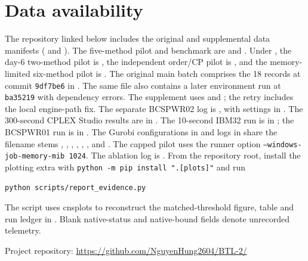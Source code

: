 \documentclass[a4paper,fleqn]{cas-sc}
\begin{document}
\section*{Data availability}
The repository linked below includes the original and supplemental data
manifests ( and ).
The five-method pilot and benchmark are  and
. Under , the day-6
two-method pilot is , the independent order/CP
pilot is , and the memory-limited six-method pilot
is . The original main batch comprises the
18 records at commit \texttt{9df7be6} in .
The same file also contains a later environment run at \texttt{ba35219}
with dependency errors. The supplement uses 
and ; the retry includes the local engine-path
fix. The separate BCSPWR02 log is , with settings in . The 300-second CPLEX Studio results are in . The 10-second IBM32 run is in ; the BCSPWR01 run is in . The Gurobi configurations in  and logs in
 share the filename stems
, , ,
, ,
, and .
The capped pilot uses the runner option \texttt{--windows-job-memory-mib 1024}.
The ablation log is .
From the repository root, install the plotting extra with
\mbox{\texttt{python -m pip install ".[plots]"}} and run
\begin{verbatim}
python scripts/report_evidence.py
\end{verbatim}
The script uses cnsplots to reconstruct the matched-threshold figure,
table and run ledger in . Blank native-status and native-bound fields denote unrecorded telemetry.



\par\medskip\noindent Project repository: \url{https://github.com/NguyenHung2604/BTL-2/}
\end{document}
